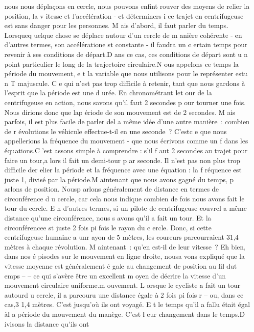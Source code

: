 \documentclass[a4paper, twoside]{article}
\begin{document}
nous nous déplaçons en cercle, nous pouvons enfint rouver des moyens de
relier la position, la v itesse et l'accélération - et déterminers i ce
trajet en centrifugeuse est sans danger pour les personnes. M ais
d'abord, il faut parler du temps. Lorsqueq uelque chose se déplace
autour d'un cercle de m anière cohérente - en d'autres termes, son
accélératione st constante - il faudra un c ertain temps pour revenir à
ses conditions de départ.D ans ce cas, ces conditions de départ sont u n
point particulier le long de la trajectoire circulaire.N ous appelons ce
temps la période du mouvement, e t la variable que nous utilisons pour
le représenter estu n T majuscule. C e qui n'est pas trop difficile à
retenir, tant que nous gardons à l'esprit que la période est une d urée.
En chronométrant let our de la centrifugeuse en action, nous savons
qu'il faut 2 secondes p our tourner une fois. Nous dirions donc que lap
ériode de son mouvement est de 2 secondes. M ais parfois, il est plus
facile de parler del a même idée d'une autre manière~: combien de r
évolutions le véhicule effectue-t-il en une seconde~? C'estc e que nous
appellerions la fréquence du mouvement - que nous écrivons comme un f
dans les équations.C 'est assons simple à comprendre : s'il f aut 2
secondes au trajet pour faire un tour,a lors il fait un demi-tour p ar
seconde. Il n'est pas non plus trop difficile der elier la période et la
fréquence avec une équation : la f réquence est juste 1, divisé par la
période.M aintenant que nous avons gagné du temps, p arlons de position.
Nousp arlons généralement de distance en termes de circonférence d u
cercle, car cela nous indique combien de fois nous avons fait le tour du
cercle. E n d'autres termes, si un pilote de centrifugeuse couvrel a
même distance qu'une circonférence, nous s avons qu'il a fait un tour.
Et la circonférencee st juste 2 fois pi fois le rayon du c ercle. Donc,
si cette centrifugeuse humaine a unr ayon de 5 mètres, les coureurs
parcourraient 31,4 mètres à chaque révolution. M aintenant~: qu'en
est-il de leur vitesse~? Eh bien, dans nos é pisodes sur le mouvement en
ligne droite, nousa vons expliqué que la vitesse moyenne est
généralement é gale au changement de position au fil dut emps -- -- ce
qui s'avère être un excellent m oyen de décrire la vitesse d'un
mouvement circulaire uniforme.m ouvement. L orsque le cycliste a fait un
tour autourd u cercle, il a parcouru une distance égale à 2 fois pi fois
r -- ou, dans ce cas,3 1,4 mètres. C'est jusqu'où ils ont voyagé. E t le
temps qu'il a fallu était égal àl a période du mouvement du manège.
C'est l eur changement dans le temps.D ivisons la distance qu'ils ont
\end{document}
